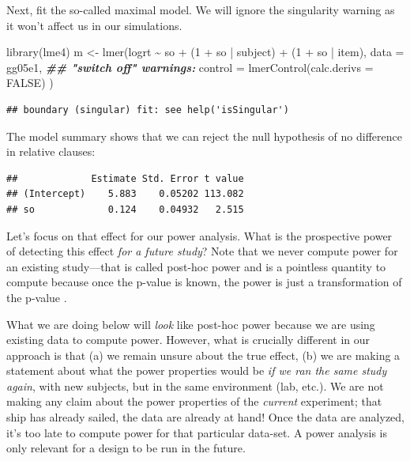 \documentclass[
  12pt,
]{krantz}
\newenvironment{Shaded}{\begin{snugshade}}{\end{snugshade}}
\newcommand{\AttributeTok}[1]{\textcolor[rgb]{0.77,0.63,0.00}{#1}}
\newcommand{\ConstantTok}[1]{\textcolor[rgb]{0.00,0.00,0.00}{#1}}
\newcommand{\DecValTok}[1]{\textcolor[rgb]{0.00,0.00,0.81}{#1}}
\newcommand{\DocumentationTok}[1]{\textcolor[rgb]{0.56,0.35,0.01}{\textbf{\textit{#1}}}}
\newcommand{\FunctionTok}[1]{\textcolor[rgb]{0.00,0.00,0.00}{#1}}
\newcommand{\NormalTok}[1]{#1}
\newcommand{\OtherTok}[1]{\textcolor[rgb]{0.56,0.35,0.01}{#1}}
\newcommand{\SpecialCharTok}[1]{\textcolor[rgb]{0.00,0.00,0.00}{#1}}
\theoremstyle{definition}
\theoremstyle{definition}
\theoremstyle{definition}
\theoremstyle{definition}
\theoremstyle{remark}
\begin{document}
Next, fit the so-called maximal model. We will ignore the singularity warning as it won't affect us in our simulations.

\begin{Shaded}
\begin{Highlighting}[]
\FunctionTok{library}\NormalTok{(lme4)}
\NormalTok{m }\OtherTok{\textless{}{-}} \FunctionTok{lmer}\NormalTok{(logrt }\SpecialCharTok{\textasciitilde{}}\NormalTok{ so }\SpecialCharTok{+}
\NormalTok{  (}\DecValTok{1} \SpecialCharTok{+}\NormalTok{ so }\SpecialCharTok{|}\NormalTok{ subject) }\SpecialCharTok{+}
\NormalTok{  (}\DecValTok{1} \SpecialCharTok{+}\NormalTok{ so }\SpecialCharTok{|}\NormalTok{ item),}
\AttributeTok{data =}\NormalTok{ gg05e1,}
\DocumentationTok{\#\# "switch off" warnings:}
\AttributeTok{control =} \FunctionTok{lmerControl}\NormalTok{(}\AttributeTok{calc.derivs =} \ConstantTok{FALSE}\NormalTok{)}
\NormalTok{)}
\end{Highlighting}
\end{Shaded}

\begin{verbatim}
## boundary (singular) fit: see help('isSingular')
\end{verbatim}

The model summary shows that we can reject the null hypothesis of no difference in relative clauses:

\begin{Shaded}
\end{Shaded}

\begin{verbatim}
##             Estimate Std. Error t value
## (Intercept)    5.883    0.05202 113.082
## so             0.124    0.04932   2.515
\end{verbatim}

Let's focus on that effect for our power analysis. What is the prospective power of detecting this effect \emph{for a future study}? Note that we never compute power for an existing study---that is called post-hoc power and is a pointless quantity to compute because once the p-value is known, the power is just a transformation of the p-value \citep{hoenigheisey}.

What we are doing below will \emph{look} like post-hoc power because we are using existing data to compute power. However, what is crucially different in our approach is that (a) we remain unsure about the true effect, (b) we are making a statement about what the power properties would be \emph{if we ran the same study again}, with new subjects, but in the same environment (lab, etc.). We are not making any claim about the power properties of the \emph{current} experiment; that ship has already sailed, the data are already at hand! Once the data are analyzed, it's too late to compute power for that particular data-set. A power analysis is only relevant for a design to be run in the future.
\end{document}
